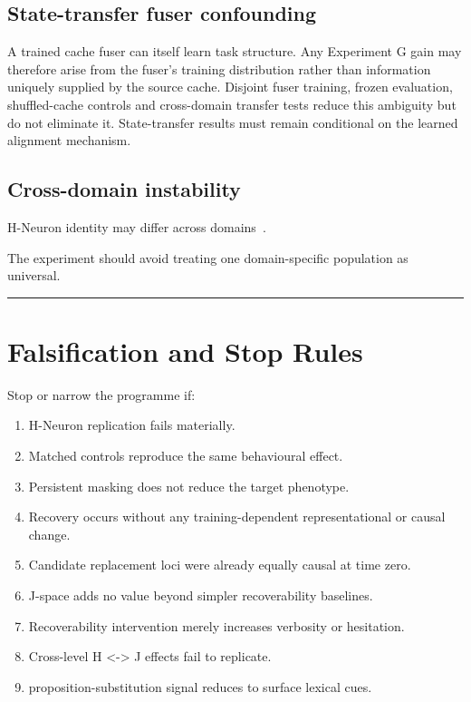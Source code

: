 \subsection{State-transfer fuser confounding}\label{state-transfer-fuser-confounding}

A trained cache fuser can itself learn task structure. Any Experiment G gain may therefore arise from the fuser's training distribution rather than information uniquely supplied by the source cache. Disjoint fuser training, frozen evaluation, shuffled-cache controls and cross-domain transfer tests reduce this ambiguity but do not eliminate it. State-transfer results must remain conditional on the learned alignment mechanism.

\subsection{Cross-domain instability}\label{cross-domain-instability}

H-Neuron identity may differ across domains~\parencite{vaddi2026generalize}.

The experiment should avoid treating one domain-specific population as universal.

\begin{center}\rule{0.5\linewidth}{0.5pt}\end{center}

\section{Falsification and Stop Rules}\label{falsification-and-stop-rules}

Stop or narrow the programme if:

\begin{enumerate}
\def\labelenumi{\arabic{enumi}.}
\tightlist
\item
  H-Neuron replication fails materially.
\item
  Matched controls reproduce the same behavioural effect.
\item
  Persistent masking does not reduce the target phenotype.
\item
  Recovery occurs without any training-dependent representational or causal change.
\item
  Candidate replacement loci were already equally causal at time zero.
\item
  J-space adds no value beyond simpler recoverability baselines.
\item
  Recoverability intervention merely increases verbosity or hesitation.
\item
  Cross-level H \textless-\textgreater{} J effects fail to replicate.
\item
  proposition-substitution signal reduces to surface lexical cues.
\end{enumerate}

